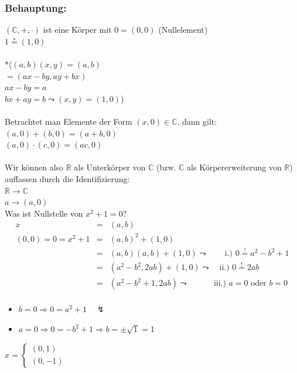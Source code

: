 \subsubsection{Behauptung:}
$(\mathbb{C},+,\cdot)$ ist eine Körper mit $0=(0,0)$ (Nullelement)\\
$1\mathop{=}\limits^{\text{*}}(1,0)$\\
\qquad\\
*($(a,b)(x,y)=(a,b)$\\
$=(ax-by,ay+bx)$\\
$ax-by=a$\\
$bx+ay=b \leadsto(x,y)=(1,0)$)\\
\qquad\\
Betrachtet man Elemente der Form $(x,0) \in \mathbb{C}$, dann gilt:\\
$(a,0)+(b,0)=(a+b,0)$\\
$(a,0)\cdot(c,0)=(ac,0)$\\
\qquad\\
Wir können also $\mathbb{R}$ als Unterkörper von $\mathbb{C}$ (bzw. $\mathbb{C}$ als Körpererweiterung von $\mathbb{R}$) auffassen durch die Identifizierung:\\
$\mathbb{R}\rightarrow\mathbb{C}$\\
$a\rightarrow(a,0)$\\
Was ist Nullstelle von $x^{2}+1=0$?
 \begin{eqnarray*}
	x&=&(a,b)\\
    (0,0)=0=x^{2}+1 &=& (a,b)^{2}+(1,0) \\
	&=& (a,b)(a,b)+(1,0) \leadsto \qquad \text{i.) }0\mathop{=}\limits^{\text{!}}a^{2}-b^{2}+1\\
	&=& (a^{2}-b^{2},2ab)+(1,0) \leadsto \quad \text{ii.) } 0 \mathop{=}\limits^{\text{!}} 2ab\\
	&=& (a^{2}-b^{2}+1,2ab) \leadsto \qquad \quad \text{iii.) } a=0 \text{ oder } b=0\\
  \end{eqnarray*}
\begin{itemize}
	\item $b=0 \Rightarrow 0=a^{2}+1 \quad \lightning$
	\item $a=0 \Rightarrow 0=-b^{2}+1\Rightarrow b = \pm\sqrt{1} = 1$
\end{itemize}
$
x=\left\{
\begin{array}{l}     
    (0,1)\\
    (0,-1)
\end{array}\right.
$\\
\qquad\\
